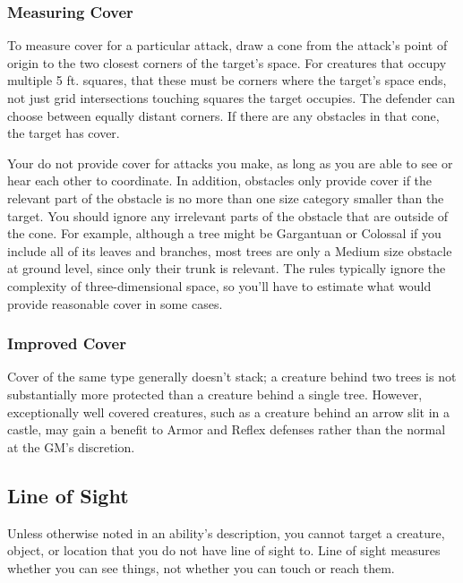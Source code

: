         \subsubsection{Measuring Cover}
            To measure cover for a particular attack, draw a cone from the attack's point of origin to the two closest corners of the target's space.
            For creatures that occupy multiple 5 ft. squares, that these must be corners where the target's space ends, not just grid intersections touching squares the target occupies.
            The defender can choose between equally distant corners.
            If there are any obstacles in that cone, the target has cover.

            Your  do not provide cover for attacks you make, as long as you are able to see or hear each other to coordinate.
            In addition, obstacles only provide cover if the relevant part of the obstacle is no more than one size category smaller than the target.
            You should ignore any irrelevant parts of the obstacle that are outside of the cone.
            For example, although a tree might be Gargantuan or Colossal if you include all of its leaves and branches, most trees are only a Medium size obstacle at ground level, since only their trunk is relevant.
            The rules typically ignore the complexity of three-dimensional space, so you'll have to estimate what would provide reasonable cover in some cases.

            \subsubsection{Improved Cover}
            Cover of the same type generally doesn't stack; a creature behind two trees is not substantially more protected than a creature behind a single tree.
            However, exceptionally well covered creatures, such as a creature behind an arrow slit in a castle, may gain a  benefit to Armor and Reflex defenses rather than the normal  at the GM's discretion.

    \subsection{Line of Sight}\label{Line of Sight}
        Unless otherwise noted in an ability's description, you cannot target a creature, object, or location that you do not have line of sight to.
        Line of sight measures whether you can see things, not whether you can touch or reach them.

